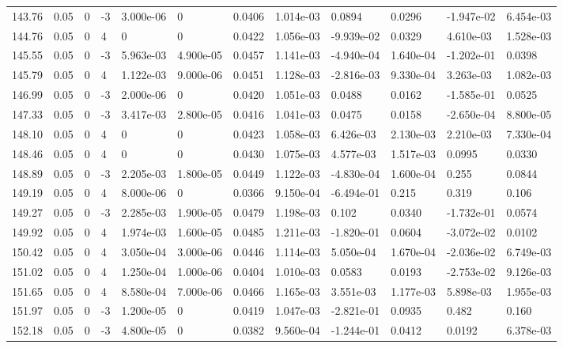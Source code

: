 \documentclass[preview]{standalone}
\begin{document}
{{{{{{{{\begin{tabular}{L{1.2cm}C{1.2cm} C{0.3cm}C{0.5cm} C{1.4cm}C{1.4cm} C{1.4cm}C{1.4cm} C{1.6cm}C{1.6cm} C{1.6cm}C{1.6cm}}
  143.76  &  0.05  & 0     & -3 &  3.000e-06  & 0  &  0.0406&   1.014e-03& 0.0894 & 0.0296   &  -1.947e-02 & 6.454e-03  \\ 
  144.76  &  0.05  & 0     &  4 &  0  & 0  &  0.0422&   1.056e-03& -9.939e-02 & 0.0329   &  4.610e-03 & 1.528e-03  \\ 
  145.55  &  0.05  & 0     & -3 &  5.963e-03  & 4.900e-05  &  0.0457&   1.141e-03& -4.940e-04 & 1.640e-04   &  -1.202e-01 & 0.0398  \\ 
  145.79  &  0.05  & 0     &  4 &  1.122e-03  & 9.000e-06  &  0.0451&   1.128e-03& -2.816e-03 & 9.330e-04   &  3.263e-03 & 1.082e-03  \\ 
  146.99  &  0.05  & 0     & -3 &  2.000e-06  & 0  &  0.0420&   1.051e-03& 0.0488 & 0.0162   &  -1.585e-01 & 0.0525  \\ 
  147.33  &  0.05  & 0     & -3 &  3.417e-03  & 2.800e-05  &  0.0416&   1.041e-03& 0.0475 & 0.0158   &  -2.650e-04 & 8.800e-05  \\ 
  148.10  &  0.05  & 0     &  4 &  0  & 0  &  0.0423&   1.058e-03& 6.426e-03 & 2.130e-03   &  2.210e-03 & 7.330e-04  \\ 
  148.46  &  0.05  & 0     &  4 &  0  & 0  &  0.0430&   1.075e-03& 4.577e-03 & 1.517e-03   &  0.0995 & 0.0330  \\ 
  148.89  &  0.05  & 0     & -3 &  2.205e-03  & 1.800e-05  &  0.0449&   1.122e-03& -4.830e-04 & 1.600e-04   &  0.255 & 0.0844  \\ 
  149.19  &  0.05  & 0     &  4 &  8.000e-06  & 0  &  0.0366&   9.150e-04& -6.494e-01 & 0.215   &  0.319 & 0.106  \\ 
  149.27  &  0.05  & 0     & -3 &  2.285e-03  & 1.900e-05  &  0.0479&   1.198e-03& 0.102 & 0.0340   &  -1.732e-01 & 0.0574  \\ 
  149.92  &  0.05  & 0     &  4 &  1.974e-03  & 1.600e-05  &  0.0485&   1.211e-03& -1.820e-01 & 0.0604   &  -3.072e-02 & 0.0102  \\ 
  150.42  &  0.05  & 0     &  4 &  3.050e-04  & 3.000e-06  &  0.0446&   1.114e-03& 5.050e-04 & 1.670e-04   &  -2.036e-02 & 6.749e-03  \\ 
  151.02  &  0.05  & 0     &  4 &  1.250e-04  & 1.000e-06  &  0.0404&   1.010e-03& 0.0583 & 0.0193   &  -2.753e-02 & 9.126e-03  \\ 
  151.65  &  0.05  & 0     &  4 &  8.580e-04  & 7.000e-06  &  0.0466&   1.165e-03& 3.551e-03 & 1.177e-03   &  5.898e-03 & 1.955e-03  \\ 
  151.97  &  0.05  & 0     & -3 &  1.200e-05  & 0  &  0.0419&   1.047e-03& -2.821e-01 & 0.0935   &  0.482 & 0.160  \\ 
  152.18  &  0.05  & 0     & -3 &  4.800e-05  & 0  &  0.0382&   9.560e-04& -1.244e-01 & 0.0412   &  0.0192 & 6.378e-03  \\ 
\hline 
\end{tabular} 

}}}}}}}}
\end{document}

